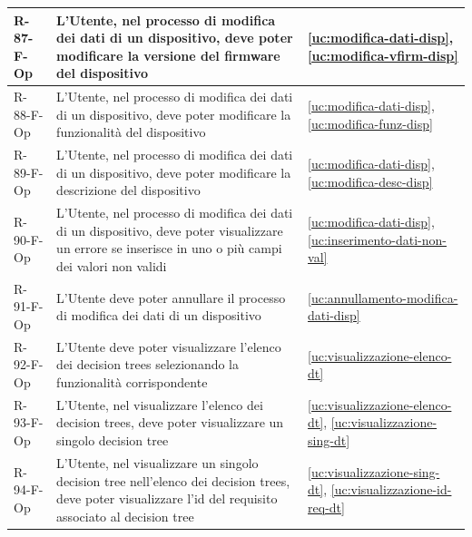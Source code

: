 ﻿\documentclass[a4paper,12pt]{article}
\begin{document}
{{\begin{longtable}{|l|p{}|p{}|}
            R-87-F-Op       & L'Utente, nel processo di modifica dei dati di un dispositivo, deve poter modificare la versione del firmware del dispositivo                                                               & \ref{uc:modifica-dati-disp}, \ref{uc:modifica-vfirm-disp}                 \\ \hline
            R-88-F-Op       & L'Utente, nel processo di modifica dei dati di un dispositivo, deve poter modificare la funzionalità del dispositivo                                                                        & \ref{uc:modifica-dati-disp}, \ref{uc:modifica-funz-disp}                 \\ \hline
            R-89-F-Op       & L'Utente, nel processo di modifica dei dati di un dispositivo, deve poter modificare la descrizione del dispositivo                                                                         & \ref{uc:modifica-dati-disp}, \ref{uc:modifica-desc-disp}                 \\ \hline
            R-90-F-Op       & L'Utente, nel processo di modifica dei dati di un dispositivo, deve poter visualizzare un errore se inserisce in uno o più campi dei valori non validi                                      & \ref{uc:modifica-dati-disp}, \ref{uc:inserimento-dati-non-val}                     \\ \hline
            R-91-F-Op       & L'Utente deve poter annullare il processo di modifica dei dati di un dispositivo                                                                                                            & \ref{uc:annullamento-modifica-dati-disp}                                               \\ \hline
            R-92-F-Op       & L'Utente deve poter visualizzare l'elenco dei decision trees selezionando la funzionalità corrispondente                                                                                    & \ref{uc:visualizzazione-elenco-dt}                                               \\ \hline
            R-93-F-Op       & L'Utente, nel visualizzare l'elenco dei decision trees, deve poter visualizzare un singolo decision tree                                                                                    & \ref{uc:visualizzazione-elenco-dt}, \ref{uc:visualizzazione-sing-dt}                 \\ \hline
            R-94-F-Op       & L'Utente, nel visualizzare un singolo decision tree nell'elenco dei decision trees, deve poter visualizzare l'id del requisito associato al decision tree                                   & \ref{uc:visualizzazione-sing-dt}, \ref{uc:visualizzazione-id-req-dt}             \\ \hline

\end{longtable}}}
\end{document}
